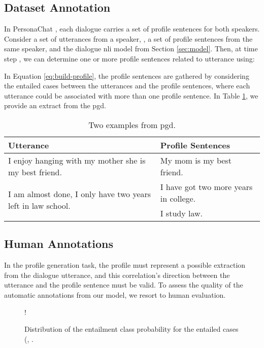 \documentclass[11pt]{article}
\begin{document}
\subsection{Dataset Annotation}

In PersonaChat \cite{PERSONACHAT}, each dialogue carries a set of profile sentences for both speakers.
Consider a set of  utterances from a speaker, , a set of  profile sentences  from the same speaker, and the dialogue \gls*{nli} model from Section \ref{sec:model}.
Then, at time step , we can determine one or more profile sentences  related to utterance  using:





In Equation \ref{eq:build-profile}, the profile sentences are gathered by considering the entailed cases between the utterances and the profile sentences, where each utterance could be associated with more than one profile sentence. 
In Table \ref{tab:example}, we provide an extract from the \gls*{pgd}.

\begin{table}[ht]
    \centering
    \begin{tabular}{p{}|p{}}
    \hline
    \textbf{Utterance} & \textbf{Profile Sentences} \\
    \hline 
    I enjoy hanging with my mother she is my best friend. & My mom is my best friend.\\
    \hline
\multirow{2}{0.45\columnwidth}{I am almost done, I only have two years left in law school.} & I have got two more years in college. \\ \cline{2-2}
    & I study law. \\
    \hline
    \end{tabular}
\caption{Two examples from \gls*{pgd}.}
\label{tab:example}
\end{table}

\subsection{Human Annotations}


In the profile generation task, the profile must represent a possible extraction from the dialogue utterance, and this correlation's direction between the utterance and the profile sentence must be valid.
To assess the quality of the automatic annotations from our model, we resort to human evaluation.

\begin{figure}[h]
\centering
\resizebox {\columnwidth} {!} {
}
\vskip-0.2cm
\caption{Distribution of the entailment class probability for the entailed cases (, .}
\label{fig:confidence-plot}
\end{figure}
\end{document}
